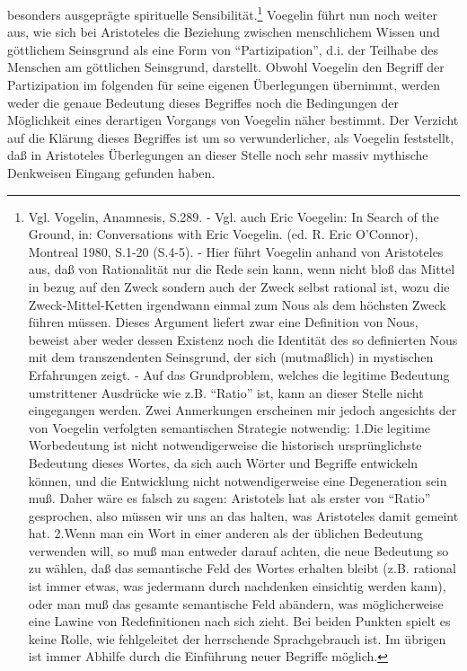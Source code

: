 besonders ausgeprägte spirituelle Sensibilität.\footnote{Vgl.
  Vogelin, Anamnesis, S.289.  - Vgl. auch Eric Voegelin: In Search of
  the Ground, in: Conversations with Eric Voegelin. (ed. R. Eric
  O'Connor), Montreal 1980, S.1-20 (S.4-5). - Hier führt Voegelin anhand
  von Aristoteles aus, daß von Rationalität nur die Rede sein kann, wenn
  nicht bloß das Mittel in bezug auf den Zweck sondern auch der Zweck
  selbst rational ist, wozu die Zweck-Mittel-Ketten irgendwann einmal
  zum Nous als dem höchsten Zweck führen müssen. Dieses Argument liefert
  zwar eine Definition von Nous, beweist aber weder dessen Existenz noch
  die Identität des so definierten Nous mit dem transzendenten
  Seinsgrund, der sich (mutmaßlich) in mystischen Erfahrungen zeigt. -
  Auf das Grundproblem, welches die legitime Bedeutung umstrittener
  Ausdrücke wie z.B.  "`Ratio"' ist, kann an dieser Stelle nicht
  eingegangen werden. Zwei Anmerkungen erscheinen mir jedoch angesichts
  der von Voegelin verfolgten semantischen Strategie notwendig: 1.Die
  legitime Worbedeutung ist nicht notwendigerweise die historisch
  ursprünglichste Bedeutung dieses Wortes, da sich auch Wörter und
  Begriffe entwickeln können, und die Entwicklung nicht notwendigerweise
  eine Degeneration sein muß. Daher wäre es falsch zu sagen: Aristotels
  hat als erster von "`Ratio"' gesprochen, also müssen wir uns an das
  halten, was Aristoteles damit gemeint hat. 2.Wenn man ein Wort in
  einer anderen als der üblichen Bedeutung verwenden will, so muß man
  entweder darauf achten, die neue Bedeutung so zu wählen, daß das
  semantische Feld des Wortes erhalten bleibt (z.B. rational ist immer
  etwas, was jedermann durch nachdenken einsichtig werden kann), oder
  man muß das gesamte semantische Feld abändern, was möglicherweise eine
  Lawine von Redefinitionen nach sich zieht. Bei beiden Punkten spielt
  es keine Rolle, wie fehlgeleitet der herrschende Sprachgebrauch ist.
  Im übrigen ist immer Abhilfe durch die Einführung neuer Begriffe
  möglich.} Voegelin führt nun noch weiter aus, wie sich bei
Aristoteles die Beziehung zwischen menschlichem Wissen und göttlichem
Seinsgrund als eine Form von "`Partizipation"', d.i. der Teilhabe des
Menschen am göttlichen Seinsgrund, darstellt. Obwohl Voegelin den
Begriff der Partizipation im folgenden für seine eigenen Überlegungen
übernimmt, werden weder die genaue Bedeutung dieses Begriffes noch die
Bedingungen der Möglichkeit eines derartigen Vorgangs von Voegelin näher
bestimmt.  Der Verzicht auf die Klärung dieses Begriffes ist um so
verwunderlicher, als Voegelin feststellt, daß in Aristoteles
Überlegungen an dieser Stelle noch sehr massiv mythische Denkweisen Eingang
gefunden haben.
 
